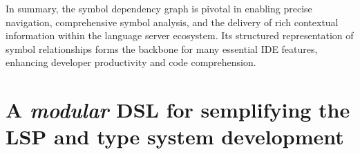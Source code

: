 In summary, the symbol dependency graph is pivotal in enabling precise navigation, comprehensive symbol analysis, and the delivery of rich contextual information within the language server ecosystem. Its structured representation of symbol relationships forms the backbone for many essential IDE features, enhancing developer productivity and code comprehension.

\section{A \textit{modular} DSL for semplifying the LSP and type system development}\label{sec:concept:AModularDSLForSemplifyingTheLSPAndTypeSystemDevelopment}

\begin{Listing}
\begin{bnf*}
    { \bnftd{*}  \bnftd{*}   \bnftd{*}}\\
    \\
    \\
    {  \bnftd{ [}  \bnftd{]}}\\
    {   \bnftd{ [}  \bnftd{]}}\\
    {    \bnftd{ [}  \bnftd{]}}\\
    {\bnfts{[ run }    \bnftd{ [}  \bnftd{]} \bnfts{ ]}}\\
    { }\\
    {  \bnfor {} }\\
    {  \bnfts{ : } } \bnftd{ [}  \bnftd{]}\\
    {\bnfts{=> }  \bnfor \bnfts{with [}  \bnfts{*]}}\\
    {  \bnfts{ : }   }\\

\end{bnf*}
\end{Listing}

